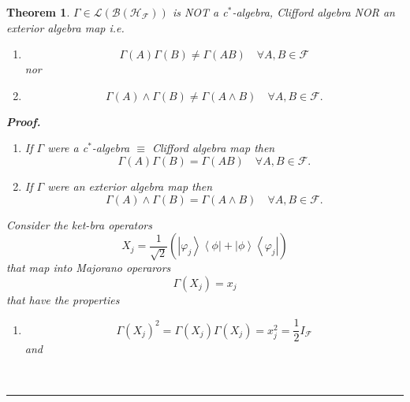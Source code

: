 \documentclass[aps,preprint]{revtex4}%
\newtheorem{theorem}{Theorem}
\newenvironment{proof}[1][Proof]{\noindent\textbf{#1.} }{\ \rule{0.5em}{0.5em}}
\begin{document}
\begin{theorem}
$\Gamma\in\mathcal{L}\left(  \mathcal{B}\left(  \mathcal{H}_{\mathcal{F}%
}\right)  \right)  $ is NOT a c$^{\ast}$-algebra, Clifford algebra NOR an
exterior algebra map i.e.

\begin{enumerate}
\item
\begin{equation}
\Gamma\left(  A\right)  \Gamma\left(  B\right)  \neq\Gamma\left(  AB\right)
\quad\forall A,B\in\mathcal{F}%
\end{equation}
nor

\item
\begin{equation}
\Gamma\left(  A\right)  \wedge\Gamma\left(  B\right)  \neq\Gamma\left(
A\wedge B\right)  \quad\forall A,B\in\mathcal{F}.
\end{equation}

\end{enumerate}

\begin{proof}
\begin{enumerate}
\item If $\Gamma$ were a c$^{\ast}$-algebra $\equiv$ Clifford algebra map
then
\begin{equation}
\Gamma\left(  A\right)  \Gamma\left(  B\right)  =\Gamma\left(  AB\right)
\quad\forall A,B\in\mathcal{F}.
\end{equation}


\item If $\Gamma$ were an exterior algebra map then
\begin{equation}
\Gamma\left(  A\right)  \wedge\Gamma\left(  B\right)  =\Gamma\left(  A\wedge
B\right)  \quad\forall A,B\in\mathcal{F}.
\end{equation}

\end{enumerate}

Consider the ket-bra operators
\begin{equation}
X_{j}=\frac{1}{\sqrt{2}}\left(  \overset{}{\left\vert \varphi_{j}\right\rangle
\left\langle \phi\right\vert +\left\vert \phi\right\rangle \left\langle
\varphi_{j}\right\vert }\right)
\end{equation}
that map into Majorano operarors
\begin{equation}
\Gamma\left(  X_{j}\right)  =x_{j}%
\end{equation}
that have the properties

\begin{enumerate}
\item
\begin{equation}
\Gamma\left(  X_{j}\right)  ^{2}=\Gamma\left(  X_{j}\right)  \Gamma\left(
X_{j}\right)  =x_{j}^{2}=\frac{1}{2}I_{\mathcal{F}}%
\end{equation}
and


\end{enumerate}
\end{proof}
\end{theorem}
\end{document}
